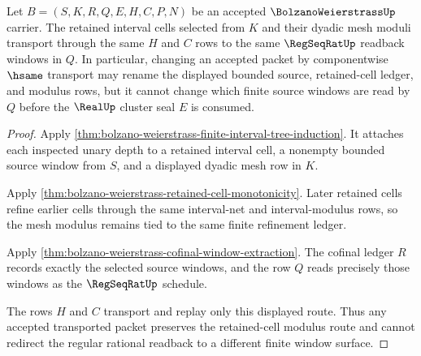 \begin{theorem}
\label{thm:bolzano-weierstrass-tail-modulus-window-stability}
Let $B=(S,K,R,Q,E,H,C,P,N)$ be an accepted $\BolzanoWeierstrassUp$ carrier. The retained interval cells selected from $K$ and their dyadic mesh moduli transport through the same $H$ and $C$ rows to the same $\RegSeqRatUp$ readback windows in $Q$. In particular, changing an accepted packet by componentwise $\hsame$ transport may rename the displayed bounded source, retained-cell ledger, and modulus rows, but it cannot change which finite source windows are read by $Q$ before the $\RealUp$ cluster seal $E$ is consumed.
\end{theorem}
\begin{proof}
Apply \autoref{thm:bolzano-weierstrass-finite-interval-tree-induction}. It attaches each inspected unary depth to a retained interval cell, a nonempty bounded source window from $S$, and a displayed dyadic mesh row in $K$.

Apply \autoref{thm:bolzano-weierstrass-retained-cell-monotonicity}. Later retained cells refine earlier cells through the same interval-net and interval-modulus rows, so the mesh modulus remains tied to the same finite refinement ledger.

Apply \autoref{thm:bolzano-weierstrass-cofinal-window-extraction}. The cofinal ledger $R$ records exactly the selected source windows, and the row $Q$ reads precisely those windows as the $\RegSeqRatUp$ schedule.

The rows $H$ and $C$ transport and replay only this displayed route. Thus any accepted transported packet preserves the retained-cell modulus route and cannot redirect the regular rational readback to a different finite window surface.
\end{proof}

